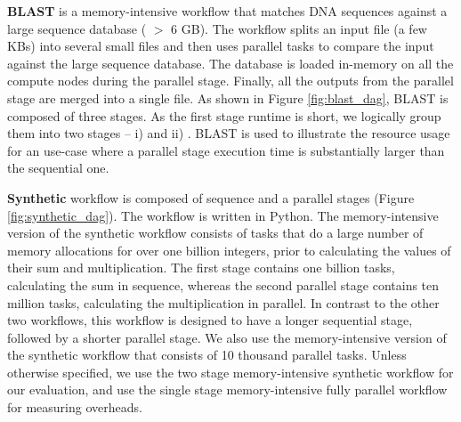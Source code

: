 \noindent \textbf{BLAST} is a memory-intensive workflow that matches DNA
sequences against a large sequence database ( $>$ 6 GB). The workflow splits
an input file (a few KBs) into several small files and then uses parallel tasks
to compare the input against the large sequence database. The database is loaded
in-memory on all the compute nodes during the parallel stage. Finally, all the
outputs from the parallel stage are merged into a single file. 
 As shown in Figure \ref{fig:blast_dag},
BLAST is composed of three stages. As the first stage runtime is short, we logically group them into
two stages -- i) \blastFirst and ii) \blastSecond.
BLAST is used to illustrate the resource usage for an use-case where a parallel stage execution
time is substantially larger than the sequential one. 

\noindent \textbf{Synthetic} workflow is composed
of sequence and a parallel stages (Figure \ref{fig:synthetic_dag}).
The workflow is written in Python. The memory-intensive version of
the synthetic workflow consists of tasks that do a large number
of memory allocations for over one billion integers, prior to
calculating the values of their sum and multiplication.
The first stage contains one billion tasks, calculating the sum in sequence,
whereas the second parallel stage contains ten million tasks, calculating the multiplication
in parallel. In contrast to the other two workflows, this workflow is designed to have
a longer sequential stage, followed by a shorter parallel stage.
We also use the memory-intensive version of the synthetic workflow that consists of 10 thousand parallel tasks. Unless otherwise specified, we use the two stage memory-intensive
synthetic workflow for our evaluation, and use the single stage memory-intensive fully parallel workflow for measuring \systemname overheads.

